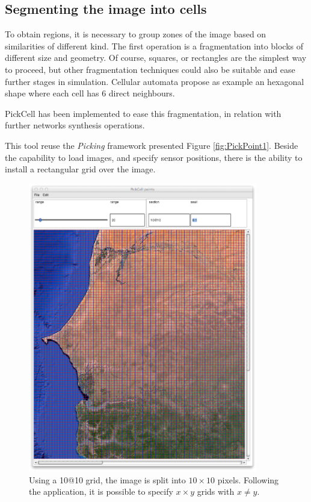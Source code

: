\subsection { Segmenting the image into cells}

To obtain regions, it is necessary to group zones of the image based on similarities of different kind.
The first operation is a fragmentation into blocks of different size and geometry. Of course,
squares, or rectangles are the simplest way to proceed, but other fragmentation techniques could also
be suitable and ease further stages in simulation. Cellular automata propose as example  an hexagonal
shape where each cell has 6 direct neighbours.

{\sc PickCell} has been implemented     to ease this fragmentation, in relation with 
further networks synthesis operations.

This tool reuse the {\sl Picking} framework presented Figure  \ref{fig:PickPoint1}. Beside the capability
to load images, and specify sensor positions, there is the ability to install a rectangular grid over the
image.


\begin{figure}[hbtp]
\begin{center} 
\includegraphics[width=10cm]{SenegalGrid10x10.png}
\caption{Using a 10@10 grid, the image is split into $10\times10$ pixels. 
Following the application, it is possible to specify $x  \times   y$ grids with $x  \neq  y$.}
\label{fig:SenegalGrid10x10}
\end{center}
\end{figure}

